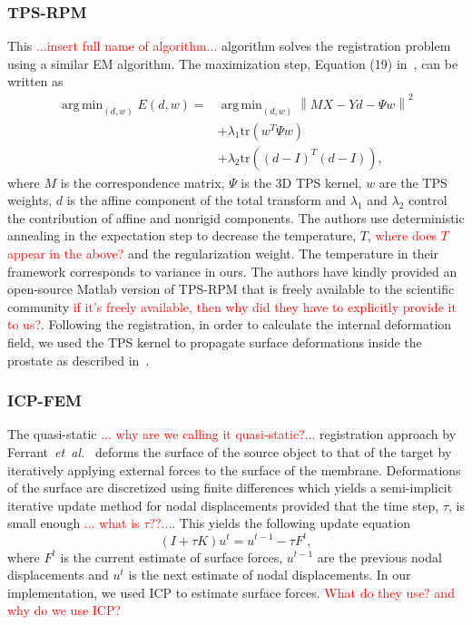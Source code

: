 \documentclass[journal]{IEEEtran}
\newcommand{\comment}[1]{\textcolor{red}{#1}}
\newcommand{\trans}[1]{#1^{\scriptscriptstyle T}}
\newcommand{\trace}{\mathrm{tr}}
\DeclareMathOperator*{\argmin}{arg\,min}
\begin{document}
\subsubsection{TPS-RPM}\label{sec:tpsrpm}
This \comment{...insert full name of algorithm...} algorithm solves the registration problem using a similar EM algorithm. The maximization step, Equation (19) in~\cite{Chui03a}, can be written as
\begin{align}
\argmin_{(d,w)} E(d,w) = & \argmin_{(d,w)} \left\|MX-Yd-{\Psi}w\right\|^2 \nonumber\\
  & + {\lambda_1}\trace({\trans{w}{\Psi}w})\nonumber\\
  & + {\lambda_2}\trace({\trans{(d-I)}(d-I)}), \label{eq:tpsrpm}
\end{align}
where $M$ is the correspondence matrix, $\Psi$ is the 3D TPS kernel, $w$ are the TPS weights, $d$ is the affine component of the total transform and $\lambda_1$ and $\lambda_2$ control the contribution of affine and nonrigid components. The authors use deterministic annealing in the expectation step to decrease the temperature, $T$, \comment{where does $T$ appear in the above?} and the regularization weight. The temperature in their framework corresponds to variance in ours. The authors have kindly provided an open-source Matlab version of TPS-RPM that is freely available to the scientific community \comment{if it's freely available, then why did they have to explicitly provide it to us?}. Following the registration, in order to calculate the internal deformation field, we used the TPS kernel to propagate surface deformations inside the prostate as described in~\cite{Sibson91a}.
\subsubsection{ICP-FEM}\label{sec:icpfem}
The quasi-static \comment{... why are we calling it quasi-static?...} registration approach by Ferrant~\textit{et~al.}~\cite{Ferrant01a} deforms the surface of the source object to that of the target by iteratively applying external forces to the surface of the membrane. Deformations of the surface are discretized using finite differences which yields a semi-implicit iterative update method for nodal displacements provided that the time step, $\tau$, is small enough \comment{... what is $\tau?$?...}. This yields the following update equation
\begin{equation}\label{eq:icpfem}
(I+\tau{K})u^t = u^{t-1} - \tau{F^t},
\end{equation}
where $F^t$ is the current estimate of surface forces, $u^{t-1}$ are the previous nodal displacements and $u^t$ is the next estimate of nodal displacements. In our implementation, we used ICP to estimate surface forces. \comment{What do they use?  and why do we use ICP?}
\end{document}
